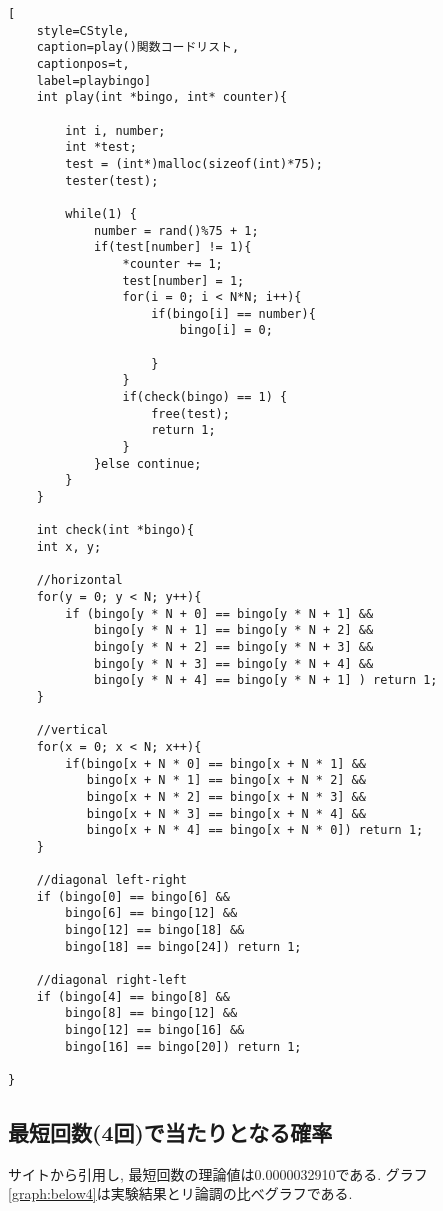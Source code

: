 \documentclass[a4j, titlepage]{jarticle}
\begin{document}
\begin{lstlisting}[
    style=CStyle, 
    caption=play()関数コードリスト,
    captionpos=t,
    label=playbingo]
    int play(int *bingo, int* counter){

        int i, number;
        int *test;
        test = (int*)malloc(sizeof(int)*75);
        tester(test);    
    
        while(1) {
            number = rand()%75 + 1;
            if(test[number] != 1){
                *counter += 1;
                test[number] = 1;
                for(i = 0; i < N*N; i++){
                    if(bingo[i] == number){
                        bingo[i] = 0;
                        
                    }
                }
                if(check(bingo) == 1) {
                    free(test);
                    return 1;
                }
            }else continue;
        }  
    }

    int check(int *bingo){
    int x, y;

    //horizontal
    for(y = 0; y < N; y++){
        if (bingo[y * N + 0] == bingo[y * N + 1] && 
            bingo[y * N + 1] == bingo[y * N + 2] &&
            bingo[y * N + 2] == bingo[y * N + 3] &&
            bingo[y * N + 3] == bingo[y * N + 4] &&
            bingo[y * N + 4] == bingo[y * N + 1] ) return 1;
    }

    //vertical
    for(x = 0; x < N; x++){
        if(bingo[x + N * 0] == bingo[x + N * 1] &&
           bingo[x + N * 1] == bingo[x + N * 2] &&
           bingo[x + N * 2] == bingo[x + N * 3] &&
           bingo[x + N * 3] == bingo[x + N * 4] &&
           bingo[x + N * 4] == bingo[x + N * 0]) return 1;
    }

    //diagonal left-right
    if (bingo[0] == bingo[6] &&
        bingo[6] == bingo[12] && 
        bingo[12] == bingo[18] && 
        bingo[18] == bingo[24]) return 1;

    //diagonal right-left
    if (bingo[4] == bingo[8] &&
        bingo[8] == bingo[12] && 
        bingo[12] == bingo[16] && 
        bingo[16] == bingo[20]) return 1;

}
\end{lstlisting}

\subsection{最短回数(4回)で当たりとなる確率}
サイトから引用し, 最短回数の理論値は0.0000032910である\cite{Bingo-確率}. グラフ\ref{graph:below4}は実験結果とリ論調の比べグラフである.
\end{document}
